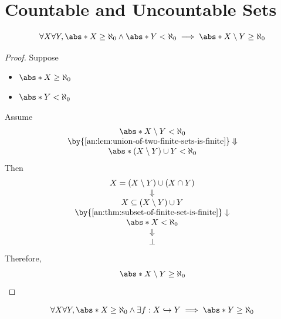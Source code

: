 \section{Countable and Uncountable Sets}

\begin{theorem} \label{an:thm:infinite-set-minus-finite-set-is-infinite}
  \[
    \forall X \forall Y, \abs*{X} \geq \aleph_{0} \land \abs*{Y} < \aleph_{0}
    \implies \abs*{X \setminus Y} \geq \aleph_{0}
  \]
\end{theorem}

\begin{proof}
  Suppose
  \begin{itemize}
    \item $\abs*{X} \geq \aleph_{0}$
    \item $\abs*{Y} < \aleph_{0}$
  \end{itemize}
  Assume
  \[
    \begin{array}{c}
      \abs*{X \setminus Y} < \aleph_{0}                                \\
      \by{\Cref{an:lem:union-of-two-finite-sets-is-finite}} \Downarrow \\
      \abs*{(X \setminus Y) \cup Y} < \aleph_{0}
    \end{array}
  \]
  Then
  \[
    \begin{array}{c}
      X = (X \setminus Y) \cup (X \cap Y)                          \\
      \Downarrow                                                   \\
      X \subseteq (X \setminus Y) \cup Y                           \\
      \by{\Cref{an:thm:subset-of-finite-set-is-finite}} \Downarrow \\
      \abs*{X} < \aleph_{0}                                        \\
      \Downarrow                                                   \\
      \bot
    \end{array}
  \]
  Therefore,
  \[
    \abs*{X \setminus Y} \geq \aleph_{0}
  \]
\end{proof}

\bigskip

\begin{theorem} \label{an:thm:injection-from-infinite-set-implies-infinite}
  \[
    \forall X \forall Y, \abs*{X} \geq \aleph_{0} \land \exists f: X \hookrightarrow Y
    \implies \abs*{Y} \geq \aleph_{0}
  \]
\end{theorem}

